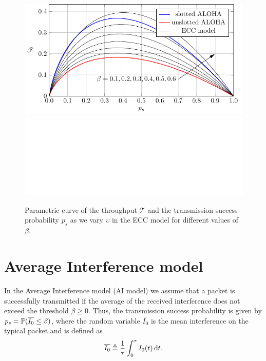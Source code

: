 \begin{figure}[htb]
    \centering
    \if{}
        \includegraphics[]{Figures/Ch5_ECC_ps.pdf}
    \else
        \includegraphics[draft, width=\textwidth]{Figures/placeholder.png}
    \fi
    \caption{Parametric curve of the throughput $\mathscr{T}$ and the transmission success probability $p_s$ as we vary $\upsilon$ in the ECC model for different values of $\beta$.}
    \label{fig:P2_ECC_ps}
\end{figure}

\section{Average Interference model}
\label{sec:AI_model}

In the Average Interference model (AI model) we assume that a packet is successfully transmitted if the average of the received interference does not exceed the threshold $\beta \ge 0$.
%
Thus, the transmission success probability is given by $p_s = \P(\overline{I_0}\le\beta)$, where the random variable $\overline{I_0}$ is the mean interference on the typical packet and is defined as
\begin{align}\label{eq:AI_I}
    \overline{I_0} \triangleq \frac{1}{\tau}\int_0^\tau I_0(t)\,\d t.
\end{align}

